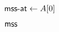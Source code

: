 
\begin{algorithm}[H]
  \begin{algorithmic}[1]
      \State \blue{$\mss \gets -\infty$}
      \State $\textsf{mss-at} \gets A[0]$

      \hStatex
          \State {}
          \State \blue{$\mss \gets \max\set{\mss, \mssat}$}
      \EndFor

      \hStatex
      \State \Return $\textsf{mss}$
    \EndProcedure
  \end{algorithmic}
\end{algorithm}